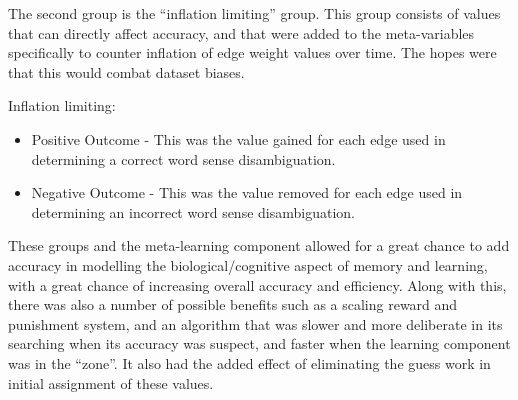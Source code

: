 The second group is the ``inflation limiting'' group.  This group consists of
values that can directly affect accuracy, and that were added to the meta-variables
specifically to counter inflation of edge weight values over time.  The hopes
were that this would combat dataset biases.

Inflation limiting: 
\begin{itemize}     
\item Positive Outcome - This was the value gained for each edge used in 
determining a correct word sense disambiguation.      
\item Negative Outcome - This was the value removed for each edge used in 
determining an incorrect word sense disambiguation.
\end{itemize}

These groups and the meta-learning component allowed for a great chance to add
accuracy in modelling the biological/cognitive aspect of memory and learning,
with a great chance of increasing overall accuracy and efficiency. Along with
this, there was also a number of possible benefits such as a scaling reward and
punishment system, and an algorithm that was slower and more deliberate in its
searching when its accuracy was suspect, and faster when the learning component
was in the ``zone''.  It also had the added effect of eliminating the guess work
in initial assignment of these values.
